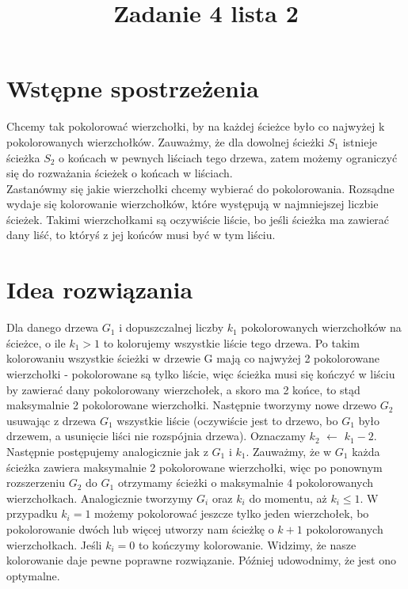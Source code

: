 \documentclass{article}
\title{Zadanie 4 lista 2}
\begin{document}
\maketitle

\tableofcontents

\section{Wstępne spostrzeżenia}
Chcemy tak pokolorować wierzchołki, by na każdej ścieżce było co najwyżej k pokolorowanych wierzchołków. Zauważmy, że dla dowolnej ścieżki $S_1$ istnieje ścieżka $S_2$ o końcach w pewnych liściach tego drzewa, zatem możemy ograniczyć się do rozważania ścieżek o końcach w liściach. \\
Zastanówmy się jakie wierzchołki chcemy wybierać do pokolorowania. Rozsądne wydaje się kolorowanie wierzchołków, które występują w najmniejszej liczbie ścieżek. Takimi wierzchołkami są oczywiście liście, bo jeśli ścieżka ma zawierać dany liść, to któryś z jej końców musi być w tym liściu. 

\section{Idea rozwiązania}
Dla danego drzewa $G_1$ i dopuszczalnej liczby $k_1$ pokolorowanych wierzchołków na ścieżce, o ile $k_1>1$ to kolorujemy wszystkie liście tego drzewa. Po takim kolorowaniu wszystkie ścieżki w drzewie G mają co najwyżej 2 pokolorowane wierzchołki - pokolorowane są tylko liście, więc ścieżka musi się kończyć w liściu by zawierać dany pokolorowany wierzchołek, a skoro ma 2 końce, to stąd maksymalnie 2 pokolorowane wierzchołki. Następnie tworzymy nowe drzewo $G_2$ usuwając z drzewa $G_1$ wszystkie liście (oczywiście jest to drzewo, bo $G_1$ było drzewem, a usunięcie liści nie rozspójnia drzewa). Oznaczamy $k_2$ $\leftarrow$ $k_1 - 2$. Następnie postępujemy analogicznie jak z $G_1$ i $k_1$. Zauważmy, że w $G_1$ każda ścieżka zawiera maksymalnie 2 pokolorowane wierzchołki, więc po ponownym rozszerzeniu $G_2$ do $G_1$ otrzymamy ścieżki o maksymalnie 4 pokolorowanych wierzchołkach. Analogicznie tworzymy $G_i$ oraz $k_i$ do momentu, aż $k_i \leq 1$. W przypadku $k_i = 1$ możemy pokolorować jeszcze tylko jeden wierzchołek, bo pokolorowanie dwóch lub więcej utworzy nam ścieżkę o $k+1$ pokolorowanych wierzchołkach. Jeśli $k_i = 0$ to kończymy kolorowanie. Widzimy, że nasze kolorowanie daje pewne poprawne rozwiązanie. Później udowodnimy, że jest ono optymalne.
\end{document}
